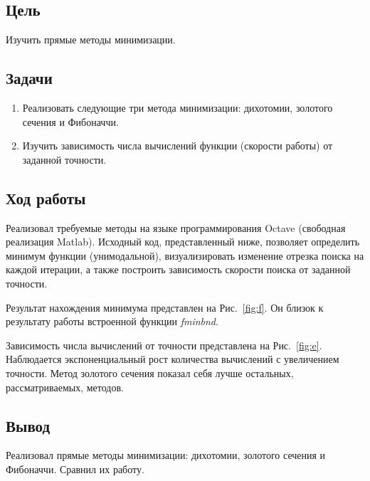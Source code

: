 

 

\newcommand{\labn}{2}


\subsection*{Цель}

Изучить прямые методы минимизации.

\subsection*{Задачи}

\begin{enumerate}
	\item Реализовать следующие три метода минимизации: дихотомии, золотого сечения и Фибоначчи.
	\item Изучить зависимость числа вычислений функции (скорости работы) от заданной точности.
\end{enumerate}

\subsection*{Ход работы}

Реализовал требуемые методы на языке программирования Octave (свободная реализация Matlab). 
Исходный код, представленный ниже, позволяет определить минимум функции (унимодальной), 
визуализировать изменение отрезка поиска на каждой итерации, 
а также построить зависимость скорости поиска от заданной точности.

Результат нахождения минимума представлен на Рис.~\ref{fig:f}. Он близок к результату работы встроенной функции \textit{fminbnd}.

Зависимость числа вычислений от точности представлена на Рис.~\ref{fig:e}. Наблюдается экспоненциальный рост количества вычислений с увеличением точности.
Метод золотого сечения показал себя лучше остальных, рассматриваемых, методов.

\subsection*{Вывод}

Реализовал прямые методы минимизации: дихотомии, золотого сечения и Фибоначчи. Сравнил их работу.


